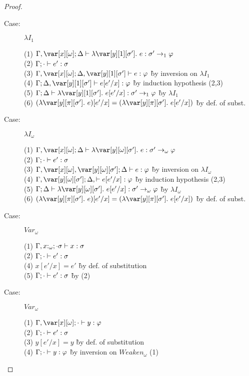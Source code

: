 \begin{proof}
\begin{description}
\item[Case:] $\lambda I_1$
\begin{tabbing}
  (1) $\G, \xo; \D \vdash \lambda\y[1][\s'].~e : \s'\to_1\vp$\\
  (2) $\Gamma; \cdot \vdash e' : \sigma$\\
  (3) $\G, \xo; \D, \y[1][\s'] \vdash e : \vp$ \` by inversion on $\lambda I_1$\\
  (4) $\G; \D, \y[1][\s'] \vdash e[e'/x] : \vp$ \` by induction hypothesis (2,3)\\
  (5) $\G; \D \vdash \lambda\y[1][\s'].~e[e'/x] : \s' \to_1\vp$ \` by $\lambda I_1$\\
  (6) $(\lambda \y[\pi][\s'].~e)[e'/x] = (\lambda \y[\pi][\s'].~e[e'/x])$ \` by def. of subst.\\
\end{tabbing}

\item[Case:] $\lambda I_\omega$
\begin{tabbing}
  (1) $\G, \xo; \D \vdash \lambda\y[\omega][\s'].~e : \s'\to_\omega\vp$\\
  (2) $\Gamma; \cdot \vdash e' : \sigma$\\
  (3) $\G, \xo, \y[\omega][\s']; \D \vdash e : \vp$ \` by inversion on $\lambda I_\omega$\\
  (4) $\G, \y[\omega][\s']; \D, \vdash e[e'/x] : \vp$ \` by induction hypothesis (2,3)\\
  (5) $\G; \D \vdash \lambda\y[\omega][\s'].~e[e'/x] : \s' \to_\omega\vp$ \` by $\lambda I_\omega$\\
  (6) $(\lambda \y[\pi][\s'].~e)[e'/x] = (\lambda \y[\pi][\s'].~e[e'/x])$ \` by def. of subst.\\
\end{tabbing}

\item[Case:] $Var_\omega$
\begin{tabbing}
  (1) $\Gamma, x{:}_\omega; \cdot \sigma \vdash x : \sigma$\\
  (2) $\Gamma; \cdot \vdash e' : \sigma$\\
  (4) $x[e'/x] = e'$ \` by def. of substitution\\
  (5) $\Gamma; \cdot \vdash e' : \sigma$ \` by (2)\\
\end{tabbing}

\item[Case:] $Var_\omega$
\begin{tabbing}
  (1) $\G, \xo; \cdot \vdash y : \vp$\\
  (2) $\Gamma; \cdot \vdash e' : \sigma$\\
  (3) $y[e'/x] = y$ \` by def. of substitution\\
  (4) $\Gamma; \cdot \vdash y : \varphi$ \` by inversion on $Weaken_\omega$ (1)\\
\end{tabbing}


\end{description}
\end{proof}
